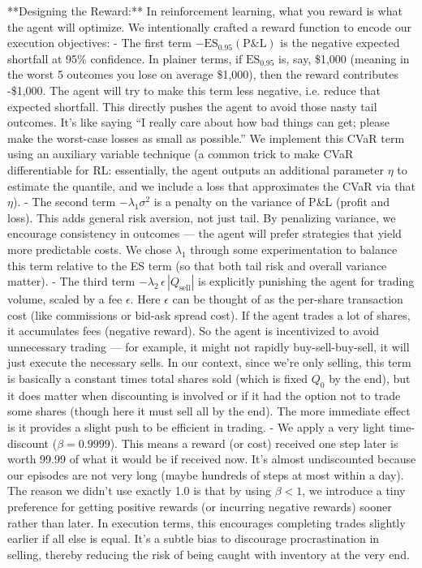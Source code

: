 \documentclass[11pt]{article}
\begin{document}
	
	
		**Designing the Reward:** In reinforcement learning, what you reward is what the agent will optimize. We intentionally crafted a reward function to encode our execution objectives:
		- The first term $-\mathrm{ES}_{0.95}(\text{P\&L})$ is the negative expected shortfall at 95\% confidence. In plainer terms, if $\mathrm{ES}_{0.95}$ is, say, \$1,000 (meaning in the worst 5 outcomes you lose on average \$1,000), then the reward contributes -\$1,000. The agent will try to make this term less negative, i.e. reduce that expected shortfall. This directly pushes the agent to avoid those nasty tail outcomes. It’s like saying “I really care about how bad things can get; please make the worst-case losses as small as possible.” We implement this CVaR term using an auxiliary variable technique (a common trick to make CVaR differentiable for RL: essentially, the agent outputs an additional parameter $\eta$ to estimate the quantile, and we include a loss that approximates the CVaR via that $\eta$).
		- The second term $-\lambda_1 \sigma^2$ is a penalty on the variance of P\&L (profit and loss). This adds general risk aversion, not just tail. By penalizing variance, we encourage consistency in outcomes — the agent will prefer strategies that yield more predictable costs. We chose $\lambda_1$ through some experimentation to balance this term relative to the ES term (so that both tail risk and overall variance matter).
		- The third term $-\lambda_2\,\epsilon\,|Q_{\mathrm{sell}}|$ is explicitly punishing the agent for trading volume, scaled by a fee $\epsilon$. Here $\epsilon$ can be thought of as the per-share transaction cost (like commissions or bid-ask spread cost). If the agent trades a lot of shares, it accumulates fees (negative reward). So the agent is incentivized to avoid unnecessary trading — for example, it might not rapidly buy-sell-buy-sell, it will just execute the necessary sells. In our context, since we’re only selling, this term is basically a constant times total shares sold (which is fixed $Q_0$ by the end), but it does matter when discounting is involved or if it had the option not to trade some shares (though here it must sell all by the end). The more immediate effect is it provides a slight push to be efficient in trading.
		- We apply a very light time-discount ($\beta = 0.9999$). This means a reward (or cost) received one step later is worth 99.99 of what it would be if received now. It’s almost undiscounted because our episodes are not very long (maybe hundreds of steps at most within a day). The reason we didn’t use exactly 1.0 is that by using $\beta < 1$, we introduce a tiny preference for getting positive rewards (or incurring negative rewards) sooner rather than later. In execution terms, this encourages completing trades slightly earlier if all else is equal. It’s a subtle bias to discourage procrastination in selling, thereby reducing the risk of being caught with inventory at the very end.
		
\end{document}
